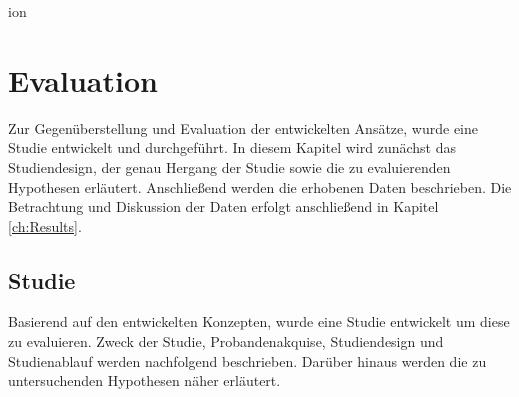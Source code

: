
ion\chapter{Evaluation}
\label{ch:evaluation}

Zur Gegenüberstellung und Evaluation der entwickelten Ansätze, wurde eine Studie entwickelt und durchgeführt. In diesem Kapitel wird zunächst das Studiendesign, der genau Hergang der Studie sowie die zu evaluierenden Hypothesen erläutert. Anschließend werden die erhobenen Daten beschrieben. Die Betrachtung und Diskussion der Daten erfolgt anschließend in Kapitel \ref{ch:Results}. 

\section{Studie}
Basierend auf den entwickelten Konzepten, wurde eine Studie entwickelt um diese zu evaluieren. Zweck der Studie, Probandenakquise, Studiendesign und Studienablauf werden nachfolgend beschrieben. Darüber hinaus werden die zu untersuchenden Hypothesen näher erläutert. 



